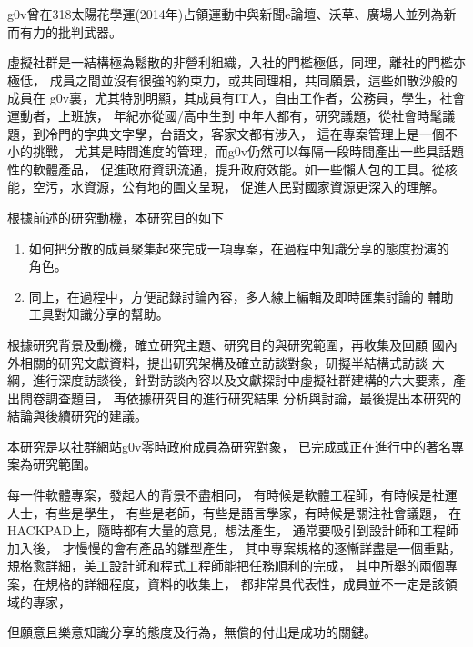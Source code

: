 g0v曾在318太陽花學運(2014年)占領運動中與新聞e論壇、沃草、廣場人並列為新而有力的批判武器。

虛擬社群是一結構極為鬆散的非營利組織，入社的門檻極低，同理，離社的門檻亦極低，
成員之間並沒有很強的約束力，或共同理相，共同願景，這些如散沙般的成員在
g0v裏，尤其特別明顯，其成員有IT人，自由工作者，公務員，學生，社會運動者，上班族，
年紀亦從國/高中生到
中年人都有，研究議題，從社會時髦議題，到冷門的字典文字學，台語文，客家文都有涉入，
這在專案管理上是一個不小的挑戰，
尤其是時間進度的管理，而g0v仍然可以每隔一段時間產出一些具話題性的軟體產品，
促進政府資訊流通，提升政府效能。如一些懶人包的工具。從核能，空污，水資源，公有地的圖文呈現，
促進人民對國家資源更深入的理解。





根據前述的研究動機，本研究目的如下
\begin{enumerate}
\item 如何把分散的成員聚集起來完成一項專案，在過程中知識分享的態度扮演的
   角色。
\item 同上，在過程中，方便記錄討論內容，多人線上編輯及即時匯集討論的
   輔助工具對知識分享的幫助。

\end{enumerate}


根據研究背景及動機，確立研究主題、研究目的與研究範圍，再收集及回顧
國內外相關的研究文獻資料，提出研究架構及確立訪談對象，研擬半結構式訪談
大綱，進行深度訪談後，針對訪談內容以及文獻探討中虛擬社群建構的六大要素，產出問卷調查題目，
再依據研究目的進行研究結果
分析與討論，最後提出本研究的結論與後續研究的建議。  







本研究是以社群網站g0v零時政府成員為研究對象，
已完成或正在進行中的著名專案為研究範圍。

每一件軟體專案，發起人的背景不盡相同，
有時候是軟體工程師，有時候是社運人士，有些是學生，
有些是老師，有些是語言學家，有時候是關注社會議題，
在HACKPAD上，隨時都有大量的意見，想法產生，
通常要吸引到設計師和工程師加入後，
才慢慢的會有產品的雛型產生，
其中專案規格的逐慚詳盡是一個重點，
規格愈詳細，美工設計師和程式工程師能把任務順利的完成，
其中所舉的兩個專案，在規格的詳細程度，資料的收集上，
都非常具代表性，成員並不一定是該領域的專家，


但願意且樂意知識分享的態度及行為，無償的付出是成功的關鍵。


